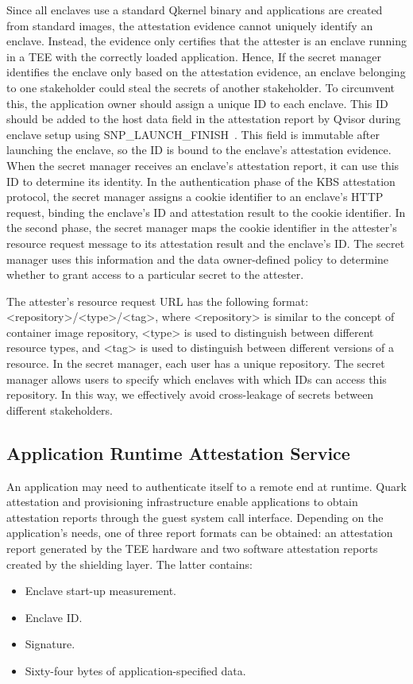 Since all enclaves use a standard Qkernel binary and applications are created from standard images, the attestation evidence cannot uniquely identify an enclave. Instead, the evidence only certifies that the attester is an enclave running in a 
TEE with the correctly loaded application. Hence, If the secret manager identifies the enclave only based on the attestation evidence, an enclave belonging to one stakeholder could steal the secrets of another stakeholder. To circumvent this, 
the application owner should assign a unique ID to each enclave. This ID should be added to the host data field in the attestation report by Qvisor during enclave setup using SNP\_LAUNCH\_FINISH~\cite*{snp_firmware}. This field is immutable after launching the enclave, 
so the ID is bound to the enclave's attestation evidence. When the secret manager receives an enclave's attestation report, it can use this ID to determine its identity. In the authentication phase of the KBS attestation protocol, the secret 
manager assigns a cookie identifier to an enclave's HTTP request, binding the enclave's ID and attestation result to the cookie identifier. In the second phase, the secret manager maps the cookie identifier in the attester's resource request message 
to its attestation result and the enclave's ID. The secret manager uses this information and the data owner-defined policy to determine whether to grant access to a particular secret to the attester. 

The attester's resource request URL has the following format: <repository>/<type>/<tag>, where <repository> is similar to the concept of container image repository, <type> is used to distinguish between different resource types, and <tag> is used 
to distinguish between different versions of a resource. In the secret manager, each user has a unique repository. The secret manager allows users to specify which enclaves with which IDs can access this repository. In this way, we effectively avoid 
cross-leakage of secrets between different stakeholders.

\subsection{Application Runtime Attestation Service}
\label{sec:runtime_attesation}

An application may need to authenticate itself to a remote end at runtime. Quark attestation and provisioning infrastructure enable applications to obtain attestation reports through the guest system call interface. 
Depending on the application's needs, one of three report formats can be obtained: an attestation report generated by the TEE hardware and two software attestation reports created by the shielding layer. The latter contains:
\begin{itemize}
    \item Enclave start-up measurement.
    \item Enclave ID.
    \item Signature.
    \item Sixty-four bytes of application-specified data.
  \end{itemize}

